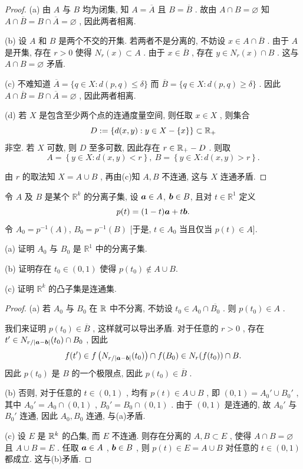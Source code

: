 \documentclass{article}
\begin{document}
\begin{proof}
    (a) 由 \( A \) 与 \( B \) 均为闭集, 知 \( A=\overline{A} \) 且 \( B=\overline{B} \) . 故由 \( A\cap B=\varnothing \) 知 \( A\cap\overline{B}=B\cap\overline{A}=\varnothing \) , 因此两者相离.\par
    (b) 设 \( A \) 和 \( B \) 是两个不交的开集. 若两者不是分离的, 不妨设 \( x\in A\cap\overline{B} \) . 由于 \( A \) 是开集, 存在 \( r>0 \) 使得 \( N_r(x)\subset A \) . 由于 \( x\in\overline{B} \) , 存在 \( y\in N_r(x)\cap B \) . 这与 \( A\cap B=\varnothing \) 矛盾.\par
    (c) 不难知道 \( \overline{A}=\{q\in X:d(p,q)\le\delta\} \) 而 \( \overline{B}=\{q\in X:d(p,q)\ge\delta\} \) . 因此 \( A\cap\overline{B}=B\cap\overline{A}=\varnothing \) , 因此两者相离.\par
    (d) 若 \( X \) 是包含至少两个点的连通度量空间, 则任取 \( x\in X \) , 则集合
    \[ D:=\left\{d(x,y):y\in X-\{x\}\right\}\subset\mathbb{R}_+ \] 
    非空. 若 \( X \) 可数, 则 \( D \) 至多可数, 因此存在 \( r\in \mathbb{R}_+-D \) . 则取
    \[ A=\left\{y\in X:d(x,y)<r\right\},\ B=\left\{y\in X:d(x,y)>r\right\}. \] \par
    由 \( r \) 的取法知 \( X=A\cup B \) , 再由(c)知 \( A, B \) 不连通, 这与 \( X \) 连通矛盾.
\end{proof}

\begin{problem}[2-21]
    令 $A$ 及 $B$ 是某个 $\mathbb{R}^k$ 的分离子集, 设 $\boldsymbol{a}\in A$, $\boldsymbol{b}\in B$, 且对 $t\in\mathbb{R}^1$ 定义
    \[
        p(t)=(1-t)\boldsymbol{a}+t\boldsymbol{b}.
    \]
    令 $A_0=p^{-1}(A)$, $B_0=p^{-1}(B)$ [于是, $t\in A_0$ 当且仅当 $p(t)\in A$].\par
    (a) 证明 $A_0$ 与 $B_0$ 是 $\mathbb{R}^1$ 中的分离子集.\par
    (b) 证明存在 $t_0\in(0,1)$ 使得 $p(t_0)\not\in A\cup B$.\par
    (c) 证明 $\mathbb{R}^k$ 的凸子集是连通集.
\end{problem}

\begin{proof}
    (a) 若 \( A_0 \) 与 \( B_0 \) 在 \( \mathbb{R} \) 中不分离, 不妨设 \( t_0\in A_0\cap\overline{B_0} \) . 则 \( p(t_0)\in A \) . \par
    我们来证明 \( p(t_0)\in\overline{B} \) , 这样就可以导出矛盾. 对于任意的 \( r>0 \) , 存在 \( t'\in N_{r/\left|\boldsymbol{a}-\boldsymbol{b}\right|}(t_0)\cap B_0 \) , 因此
    \[ f(t')\in f \left(N_{r/\left|\boldsymbol{a}-\boldsymbol{b}\right|}(t_0)\right)\cap f(B_0)\in N_r(f(t_0))\cap B. \] 
    因此 \( p(t_0) \) 是 \( B \) 的一个极限点, 因此 \( p(t_0)\in\overline{B} \) .\par
    (b) 否则, 对于任意的 \( t\in(0,1) \) , 均有 \( p(t)\in A\cup B \) , 即 \( (0,1)=A_0'\cup B_0' \) , 其中 \( A_0'=A_0\cap(0,1) \) ,  \( B_0'=B_0\cap (0,1) \) . 由于 \( (0,1) \) 是连通的, 故 \( A_0' \) 与 \( B_0' \) 连通, 因此 \( A_0,B_0 \) 连通, 与(a)矛盾.\par
    (c) 设 \( E \) 是 \( \mathbb{R}^k \) 的凸集, 而 \( E \) 不连通. 则存在分离的 \( A, B \subset E \) , 使得 \( A\cap B=\varnothing \) 且 \( A\cup B=E \) . 任取 \( \boldsymbol{a}\in A \) , \( \boldsymbol{b}\in B \) , 则 \( p(t)\in E=A\cup B \) 对任意的 \( t\in(0,1) \) 都成立. 这与(b)矛盾. 
\end{proof}
\end{document}
